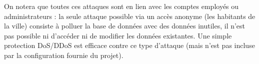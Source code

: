On notera que toutes ces attaques sont en lien avec les comptes employés ou administrateurs : la seule attaque possible via un accès anonyme (les habitants de la ville) consiste à polluer la base de données avec des données inutiles, il n’est pas possible ni d’accéder ni de modifier les données existantes.
Une simple protection DoS/DDoS est efficace contre ce type d'attaque (mais n'est pas incluse par la configuration fournie du projet).
